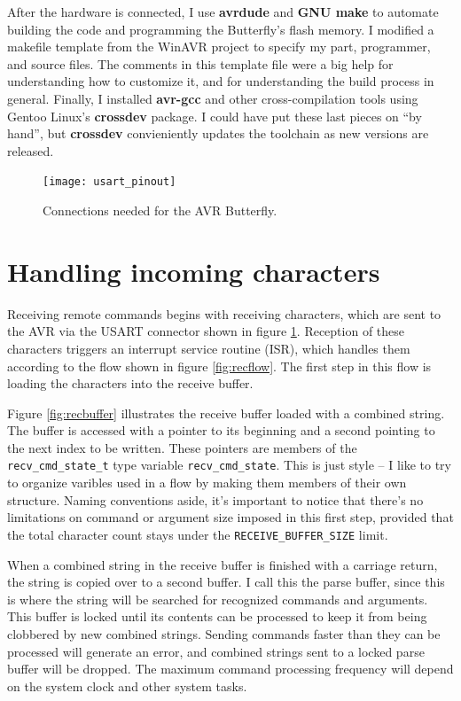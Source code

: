 After the hardware is connected, I use \textbf{avrdude}\cite{avrdude} and \textbf{GNU make}\cite{gnumake} to automate building the code and programming the Butterfly's flash memory.  I modified a makefile template from the WinAVR project\cite{winavr} to specify my part, programmer, and source files.  The comments in this template file were a big help for understanding how to customize it, and for understanding the build process in general.  Finally, I installed \textbf{avr-gcc} and other cross-compilation tools using Gentoo Linux's \textbf{crossdev} package.  I could have put these last pieces on ``by hand'', but \textbf{crossdev} convieniently updates the toolchain as new versions are released.     

\begin{figure}[ht]
    \begin{center}
        \texttt{[image: usart\_pinout]}
        \caption{Connections needed for the AVR Butterfly.\label{fig:connections}}
    \end{center}
\end{figure}

\clearpage
\section{Handling incoming characters}
Receiving remote commands begins with receiving characters, which are sent to the AVR via the USART connector shown in figure \ref{fig:connections}.  Reception of these characters triggers an interrupt service routine (ISR), which handles them according to the flow shown in figure \ref{fig:recflow}. The first step in this flow is loading the characters into the receive buffer.

Figure \ref{fig:recbuffer} illustrates the receive buffer loaded with a combined string.  The buffer is accessed with a pointer to its beginning and a second pointing to the next index to be written.  These pointers are members of the \texttt{recv\_cmd\_state\_t} type variable \texttt{recv\_cmd\_state}.  This is just style -- I like to try to organize varibles used in a flow by making them members of their own structure.  Naming conventions aside, it's important to notice that there's no limitations on command or argument size imposed in this first step, provided that the total character count stays under the \texttt{RECEIVE\_BUFFER\_SIZE} limit. 
 
When a combined string in the receive buffer is finished with a carriage return, the string is copied over to a second buffer.  I call this the parse buffer, since this is where the string will be searched for recognized commands and arguments.  This buffer is locked until its contents can be processed to keep it from being clobbered by new combined strings.  Sending commands faster than they can be processed will generate an error, and combined strings sent to a locked parse buffer will be dropped.  The maximum command processing frequency will depend on the system clock and other system tasks.  

